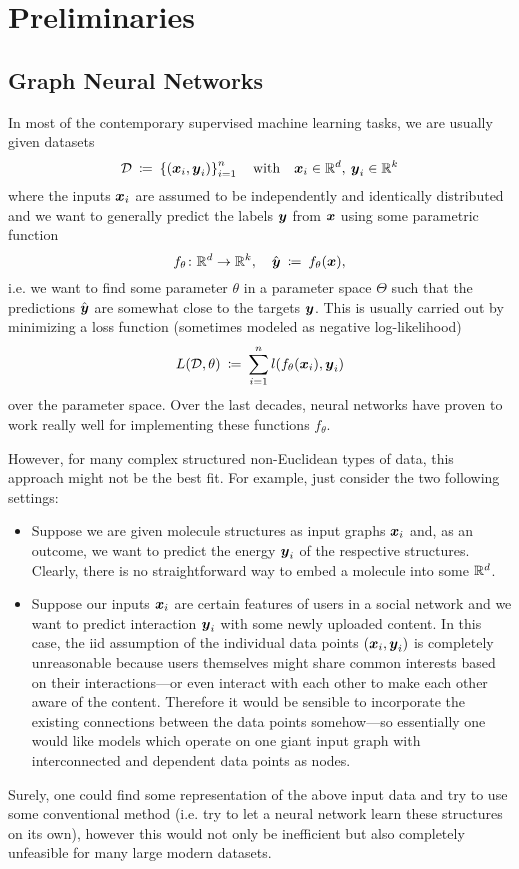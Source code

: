 \section{Preliminaries}

\subsection{Graph Neural Networks}

In most of the contemporary supervised machine learning tasks, we are usually given 
datasets
\[ 
    \mathcal{D} \: \coloneqq \: 
    \left\{(\boldsymbol{x}_i, \boldsymbol{y}_i)\right\}_{i=1}^n 
    \quad \text{with} \quad \boldsymbol{x}_i \in \mathbb{R}^{d}, \: \boldsymbol{y}_i \in \mathbb{R}^k 
\]
where the inputs $\boldsymbol{x}_i$ are assumed to be independently and identically 
distributed and we want to generally predict the labels $\boldsymbol{y}$ from $\boldsymbol{x}$ using
some parametric function
\[
    f_\theta \colon \mathbb{R}^d \to \mathbb{R}^k, \quad
    \hat{\boldsymbol{y}} \: \coloneqq \: f_\theta(\boldsymbol{x}),
\]
i.e. we want to find some parameter $\theta$ in a parameter space $\Theta$ such that
the predictions $\hat{\boldsymbol{y}}$ are somewhat close to the targets $\boldsymbol{y}$. This is usually
carried out by minimizing a loss function (sometimes modeled as negative log-likelihood)
\[
    L(\mathcal{D}, \theta) \: \coloneqq \: \sum_{i=1}^n l(f_\theta(\boldsymbol{x}_i), \boldsymbol{y}_i)
\]
over the parameter space. Over the last decades, neural networks have proven to work 
really well for implementing these functions $f_\theta$.

However, for many complex structured non-Euclidean types of data, this approach might 
not be the best fit. For example, just consider the two following settings:
\begin{itemize}
    \item Suppose we are given molecule structures as input graphs $\boldsymbol{x}_i$ and, as an 
          outcome, we want to predict the energy $\boldsymbol{y}_i$ of the respective structures. 
          Clearly, there is no straightforward way to embed a molecule into some $\mathbb{R}^d$.
    \item Suppose our inputs $\boldsymbol{x}_i$ are certain features of users in a social network
          and we want to predict interaction $\boldsymbol{y}_i$ with some newly uploaded content. In this 
          case, the iid assumption of the individual data points $(\boldsymbol{x}_i, \boldsymbol{y}_i)$ is 
          completely unreasonable because users themselves might share common interests 
          based on their interactions---or even interact with each other to make each 
          other aware of the content. Therefore it would be sensible to incorporate the 
          existing connections between the data points somehow---so essentially one would 
          like models which operate on one giant input graph with interconnected and 
          dependent data points as nodes.
\end{itemize}
Surely, one could find some representation of the above input data and try to use some
conventional method (i.e. try to let a neural network learn these structures on its own),
however this would not only be inefficient but also completely unfeasible for many large 
modern datasets. 

